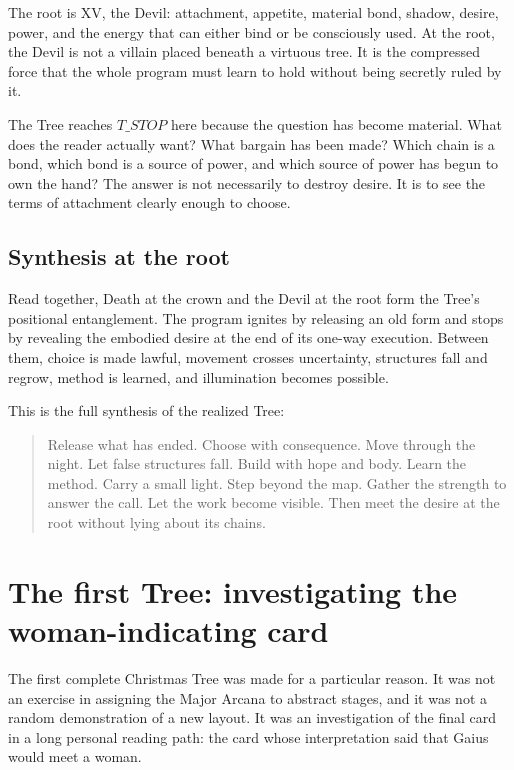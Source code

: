 The root is XV, the Devil: attachment, appetite, material bond, shadow, desire,
power, and the energy that can either bind or be consciously used. At the root,
the Devil is not a villain placed beneath a virtuous tree. It is the compressed
force that the whole program must learn to hold without being secretly ruled by
it.

The Tree reaches $T\_STOP$ here because the question has become material. What
does the reader actually want? What bargain has been made? Which chain is a
bond, which bond is a source of power, and which source of power has begun to
own the hand? The answer is not necessarily to destroy desire. It is to see the
terms of attachment clearly enough to choose.

\subsection{Synthesis at the root}

Read together, Death at the crown and the Devil at the root form the Tree's
positional entanglement. The program ignites by releasing an old form and stops
by revealing the embodied desire at the end of its one-way execution. Between
them, choice is made lawful, movement crosses uncertainty, structures fall and
regrow, method is learned, and illumination becomes possible.

This is the full synthesis of the realized Tree:

\begin{quote}
Release what has ended. Choose with consequence. Move through the night. Let
false structures fall. Build with hope and body. Learn the method. Carry a
small light. Step beyond the map. Gather the strength to answer the call. Let
the work become visible. Then meet the desire at the root without lying about
its chains.
\end{quote}

\section{The first Tree: investigating the woman-indicating card}

The first complete Christmas Tree was made for a particular reason. It was not
an exercise in assigning the Major Arcana to abstract stages, and it was not a
random demonstration of a new layout. It was an investigation of the final
card in a long personal reading path: the card whose interpretation said that
Gaius would meet a woman.

